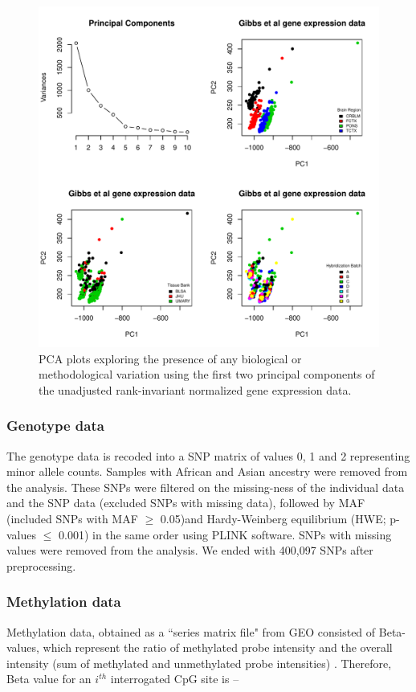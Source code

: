 \documentclass[hidelinks]{article}
\begin{document}
\begin{center}
\begin{figure}[!ht]
\includegraphics[width=\textwidth]{pca_gene_exp.pdf}
\caption[PCA plots of the gene expression data]{PCA plots exploring the presence of any biological or methodological variation using the first two principal components of the unadjusted rank-invariant normalized gene expression data.}
\end{figure}
\end{center}

\subsubsection{Genotype data}
The genotype data is recoded into a SNP matrix of values 0, 1 and 2 representing minor allele counts. Samples with African and Asian ancestry were removed from the analysis. These SNPs were filtered on the missing-ness of the individual data and the SNP data (excluded SNPs with missing data), followed by MAF (included SNPs with MAF $\geq$ 0.05)and Hardy-Weinberg equilibrium (HWE; p-values $\leq$ 0.001) in the same order using PLINK \cite{Plink} software. SNPs with missing values were removed from the analysis. We ended with 400,097 SNPs after preprocessing. 

\subsubsection{Methylation data}
Methylation data, obtained as a ``series matrix file" from GEO consisted of Beta-values, which represent the ratio of methylated probe intensity and the overall intensity (sum of methylated and unmethylated probe intensities) \cite{Beta-M}. Therefore, Beta value for an $i^{th}$ interrogated CpG site is --
\end{document}
